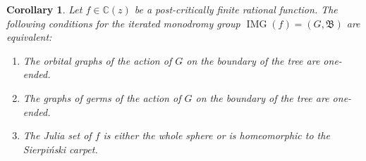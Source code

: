\documentclass[11pt]{amsart}
\newcommand{\bim}{\mathfrak{B}}
\theoremstyle{definition}
\theoremstyle{plain}
\newtheorem{main thm}{Theorem}
\newtheorem{cor}[defin]{Corollary}{}
\theoremstyle{remark}
\theoremstyle{plain}
\begin{document}
\begin{cor} \label{c-IMG}
    Let $f\in\mathbb{C}(z)$ be a post-critically finite rational function. The following conditions for the iterated monodromy group $\mathop{\mathrm{IMG}}(f)=(G, \bim)$ are equivalent:
    \begin{enumerate}
        \item The orbital graphs of the action of $G$ on the boundary of the tree are one-ended.
        \item The graphs of germs of the action of $G$ on the boundary of the tree are one-ended.
        \item The Julia set of $f$ is either the whole sphere or is homeomorphic to the Sierpi\'nski carpet.
    \end{enumerate}
\end{cor}
\end{document}

